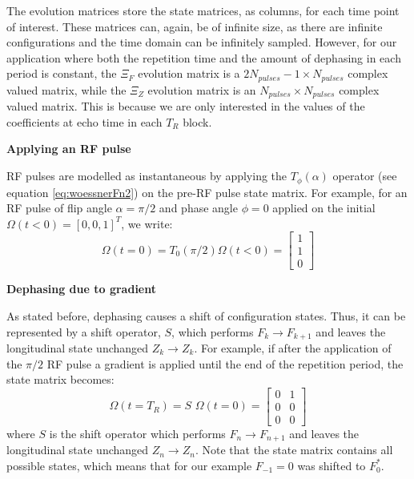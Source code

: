 The evolution matrices store the state matrices, as columns, for each time point of interest.
These matrices can, again, be of infinite size, as there are infinite configurations and the time domain can be infinitely sampled.
However, for our application where both the repetition time and the amount of dephasing in each period is constant, the $\Xi_F$ evolution matrix is a $2N_{pulses}-1 \times N_{pulses}$ complex valued matrix, while the $\Xi_Z$ evolution matrix is an $N_{pulses} \times N_{pulses}$ complex valued matrix.
This is because we are only interested in the values of the coefficients at echo time in each $T_R$ block.

\hfill

\textbf{Applying an RF pulse}

RF pulses are modelled as instantaneous by applying the $T_{\phi}(\alpha)$ operator (see equation \ref{eq:woessnerFn2}) on the pre-RF pulse state matrix.
For example, for an RF pulse of flip angle $\alpha = \pi/2$ and phase angle $\phi = 0$ applied on the initial $\Omega (t < 0) = [0, 0, 1]^T$, we write:
\begin{equation}
    \Omega (t = 0) = T_0(\pi/2) \Omega (t < 0) = 
    \begin{bmatrix} 
        1 \\
        1 \\
        0
    \end{bmatrix}
\end{equation}

\hfill

\textbf{Dephasing due to gradient}

As stated before, dephasing causes a shift of configuration states.
Thus, it can be represented by a shift operator, $S$, which performs $F_k \rightarrow F_{k+1}$ and leaves the longitudinal state unchanged $Z_k \rightarrow Z_k$. 
For example, if after the application of the $\pi/2$ RF pulse a gradient is applied until the end of the repetition period, the state matrix becomes:
\begin{equation}
    \Omega (t = T_R) = S \, \, \Omega (t = 0) = 
    \begin{bmatrix} 
        0 & 1\\
        0 & 0\\
        0 & 0
    \end{bmatrix}
\end{equation}
where $S$ is the shift operator which performs $F_n \rightarrow F_{n+1}$ and leaves the longitudinal state unchanged $Z_n \rightarrow Z_n$. 
Note that the state matrix contains all possible states, which means that for our example $F_{-1} = 0$ was shifted to $F_0^*$.

